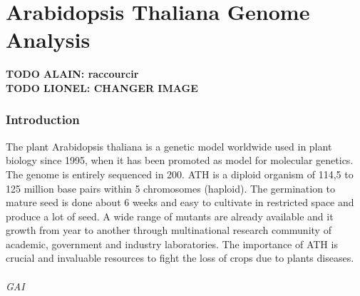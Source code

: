 \documentclass[10pt,a4paper]{article}
\begin{document}
 
 
 
 
 









\newpage
\part*{Arabidopsis Thaliana Genome Analysis}

\textbf{TODO ALAIN: raccourcir}\\

\noindent\textbf{TODO LIONEL: CHANGER IMAGE}

\section*{Introduction}
The plant Arabidopsis thaliana is a genetic model worldwide used in plant biology since 1995, when it has been promoted as model for molecular genetics. The genome is entirely sequenced in 200. ATH is a diploid organism of 114,5 to 125 million base pairs within 5 chromosomes (haploid). The germination to mature seed is done about 6 weeks and easy to cultivate in restricted space and produce a lot of seed. A wide range of mutants are already available and it growth from year to another through multinational research community of academic, government and industry laboratories. The importance of ATH is crucial and invaluable resources to fight the loss of crops due to plants diseases.


%
%
%


\paragraph{GAI} 
\end{document}
